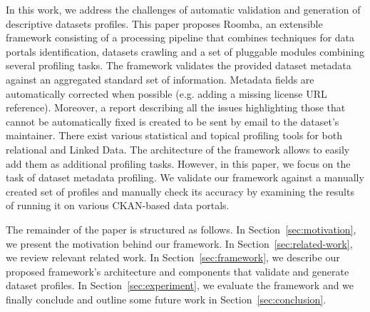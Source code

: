 \documentclass[runningheads,a4paper]{../../Util/LaTEX/llncs}
\begin{document}
In this work, we address the challenges of automatic validation and generation of descriptive datasets profiles. This paper proposes Roomba, an extensible framework consisting of a processing pipeline that combines techniques for data portals identification, datasets crawling and a set of pluggable modules combining several profiling tasks. The framework validates the provided dataset metadata against an aggregated standard set of information. Metadata fields are automatically corrected when possible (e.g. adding a missing license URL reference). Moreover, a report describing all the issues highlighting those that cannot be automatically fixed is created to be sent by email to the dataset's maintainer. There exist various statistical and topical profiling tools for both relational and Linked Data. The architecture of the framework allows to easily add them as additional profiling tasks. However, in this paper, we focus on the task of dataset metadata profiling. We validate our framework against a manually created set of profiles and manually check its accuracy by examining the results of running it on various CKAN-based data portals.

The remainder of the paper is structured as follows. In Section~\ref{sec:motivation}, we present the motivation behind our framework. In Section~\ref{sec:related-work}, we review relevant related work. In Section~\ref{sec:framework}, we describe our proposed framework's architecture and components that validate and generate dataset profiles. In Section~\ref{sec:experiment}, we evaluate the framework and we finally conclude and outline some future work in Section~\ref{sec:conclusion}.

\end{document}
